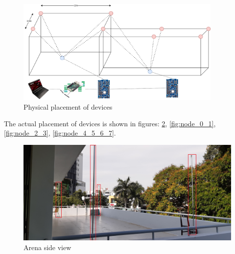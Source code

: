 \documentclass[\main/main.tex]{subfiles}
\begin{document}
\begin{figure}[H]     
    \centering
    \includegraphics[width=0.9\textwidth]{system_overview_phy.png}
    \caption{Physical placement of devices}
    \label{fig:physical placement of devices}
\end{figure}
The actual placement of devices is shown in figures: \ref{fig:arena_00}, \ref{fig:node_0_1}, \ref{fig:node_2_3}, \ref{fig:node_4_5_6_7}.

\begin{figure}[H]      
    \centering
    \includegraphics[width=1\textwidth]{arena_00.jpg}
    \caption{Arena side view}
    \label{fig:arena_00}
\end{figure}

\end{document}
